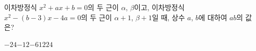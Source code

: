 이차방정식 $x^2+ax+b=0$의 두 근이 $\alpha$, $\beta$이고, 이차방정식 $x^2-(b-3)x-4a=0$의 두 근이 $\alpha+1$, $\beta+1$일 때, 상수 $a$, $b$에 대하여 $ab$의 값은?
\begin{choices32}{$-24$}{$-12$}{$-6$}{$12$}{$24$}\end{choices32}
